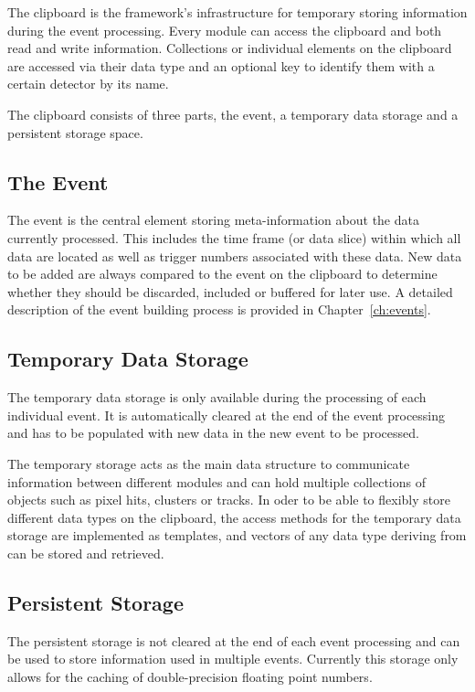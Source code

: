 The clipboard is the framework's infrastructure for temporary storing information during the event processing.
Every module can access the clipboard and both read and write information.
Collections or individual elements on the clipboard are accessed via their data type and an optional key to identify them with a certain detector by its name.

The clipboard consists of three parts, the event, a temporary data storage and a persistent storage space.

\subsection{The Event}

The event is the central element storing meta-information about the data currently processed.
This includes the time frame (or data slice) within which all data are located as well as trigger numbers associated with these data.
New data to be added are always compared to the event on the clipboard to determine whether they should be discarded, included or buffered for later use.
A detailed description of the event building process is provided in Chapter~\ref{ch:events}.

\subsection{Temporary Data Storage}
The temporary data storage is only available during the processing of each individual event.
It is automatically cleared at the end of the event processing and has to be populated with new data in the new event to be processed.

The temporary storage acts as the main data structure to communicate information between different modules and can hold multiple collections of \corry objects such as pixel hits, clusters or tracks.
In oder to be able to flexibly store different data types on the clipboard, the access methods for the temporary data storage are implemented as templates, and vectors of any data type deriving from  can be stored and retrieved.

\subsection{Persistent Storage}
The persistent storage is not cleared at the end of each event processing and can be used to store information used in multiple events.
Currently this storage only allows for the caching of double-precision floating point numbers.


